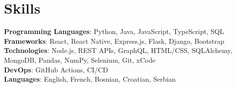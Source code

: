 \section{Skills}
    \begin{itemize}[leftmargin=0.15in, label={}]
	\small{\item{
		\textbf{Programming Languages}{: Python, Java, JavaScript, TypeScript, SQL} \\
		\textbf{Frameworks}{: React, React Native, Express.js, Flask, Django, Bootstrap} \\
		\textbf{Technologies}{: Node.js, REST APIs, GraphQL,  HTML/CSS, SQLAlchemy, MongoDB, Pandas, NumPy, Selenium, Git, xCode} \\
		\textbf{DevOps}{: GitHub Actions, CI/CD} \\
		\textbf{Languages}{: English, French, Bosnian, Croatian, Serbian} \\
	}}
    \end{itemize}
